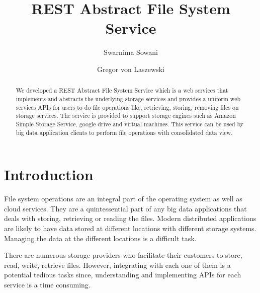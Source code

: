 
\title{REST Abstract File System Service}


\author{Swarnima Sowani}

\author{Gregor von Laszewski}


\renewcommand{\shortauthors}{G. v. Laszewski}

\begin{abstract}

  We developed a REST Abstract File System Service which is a web
  services that implements and abstracts the underlying storage
  services and provides a uniform web services APIs for users to do
  file operations like, retrieving, storing, removing files on storage
  services. The service is provided to support storage engines such as
  Amazon Simple Storage Service, google drive and virtual
  machines. This service can be used by big data application clients
  to perform file operations with consolidated data view.
\end{abstract}



\maketitle


\section{Introduction}

File system operations are an integral part of the operating system as
well as cloud services. They are a quintessential part of any big data
applications that deals with storing, retrieving or reading the
files. Modern distributed applications are likely to have data stored at
different locations with different storage systems. Managing the data
at the different locations is a difficult task.

There are numerous storage providers who facilitate their customers to
store, read, write, retrieve files. However, integrating with each one
of them is a potential tedious tasks since, understanding and
implementing APIs for each service is a time consuming.

